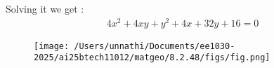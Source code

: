 \documentclass[journal]{IEEEtran}
\begin{document}
Solving it we get :
\begin{align}
 4x^{2} + 4xy + y^{2} + 4x + 32y + 16 = 0
\end{align}



\begin{figure}[h!]
   \centering
   \texttt{[image: /Users/unnathi/Documents/ee1030-2025/ai25btech11012/matgeo/8.2.48/figs/fig.png]}
   \caption{}
   \label{stemplot}
\end{figure}
\end{document}
